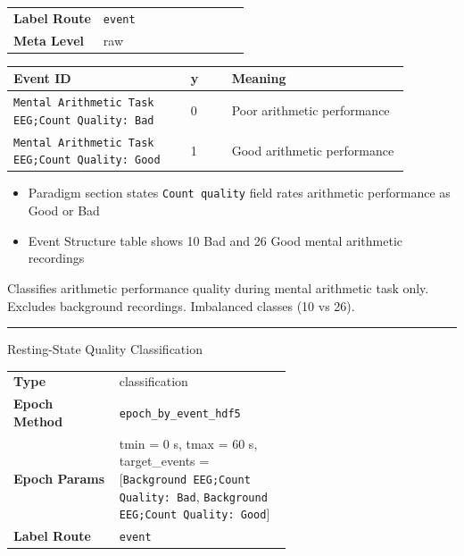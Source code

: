 {\begin{tcolorbox}
{\begin{tabular}{@{}lp{0.62\linewidth}@{}}
\textbf{Label Route} & \texttt{event} \\
\textbf{Meta Level} & raw \\
\end{tabular}}
\par{}\par\smallskip
\begingroup\footnotesize
\begin{tabular}{@{}p{0.3911\linewidth}p{0.0978\linewidth}p{0.3911\linewidth}@{}}
\toprule
\textbf{Event ID} & \textbf{y} & \textbf{Meaning} \\
\midrule
\texttt{Mental Arithmetic Task EEG;Count Quality: Bad} & 0 & Poor arithmetic performance \\
\texttt{Mental Arithmetic Task EEG;Count Quality: Good} & 1 & Good arithmetic performance \\
\bottomrule
\end{tabular}
\endgroup
\par{}\par
\begin{itemize}[leftmargin=1.3em,noitemsep,topsep=1pt]
\item[\scriptsize$\cdot$] {\scriptsize Paradigm section states \texttt{Count quality} field rates arithmetic performance as Good or Bad}
\item[\scriptsize$\cdot$] {\scriptsize Event Structure table shows 10 Bad and 26 Good mental arithmetic recordings}
\end{itemize}
\par{} {\footnotesize Classifies arithmetic performance quality during mental arithmetic task only. Excludes background recordings. Imbalanced classes (10 vs 26).}
\noindent\rule{\linewidth}{0.7pt}\par\nopagebreak
{} {\footnotesize Resting-State Quality Classification}\par\smallskip
{\footnotesize\begin{tabular}{@{}lp{0.62\linewidth}@{}}
\textbf{Type} & classification \\
\textbf{Epoch Method} & \texttt{epoch\_by\_event\_hdf5} \\
\textbf{Epoch Params} & tmin = 0 s, tmax = 60 s, target\_events = [\texttt{Background EEG;Count Quality: Bad}, \texttt{Background EEG;Count Quality: Good}] \\
\textbf{Label Route} & \texttt{event} \\

\end{tabular}}
\end{tcolorbox}}
